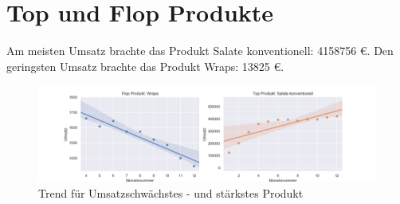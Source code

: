 \documentclass[10pt,a4paper]{article}
\begin{document}
\section*{Top und Flop Produkte}
Am meisten Umsatz brachte das Produkt Salate konventionell: 4158756 \euro. Den geringsten Umsatz brachte das Produkt Wraps: 13825 \euro.

\begin{figure}[h]
\centering
    \includegraphics[width=1\textwidth]{img/flopundtop.png}
\caption{Trend für Umsatzschwächstes - und stärkstes Produkt} 
\end{figure}
\end{document}
